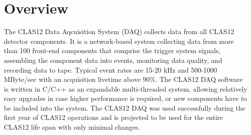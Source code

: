 \section{Overview}

The CLAS12 Data Aqcuisition System (DAQ) collects data from all CLAS12 detector components. It is a network-based system collecting data from more than 100 front-end components that comprise the trigger system signals, assembling the component data into events, monitoring data quality, and recording data to tape. Typical event rates are 15-20 kHz and 500-1000 MByte/sec with an acquisition livetime above 90\%. The CLAS12 DAQ software is written in C/C++ as an expandable multi-threaded system, allowing relatively easy upgrades in case higher performance is required, or new components have to be included into the system. The CLAS12 DAQ was used successfully during the first year of CLAS12 operations and is projected to be used for the entire CLAS12 life span with only minimal changes.


